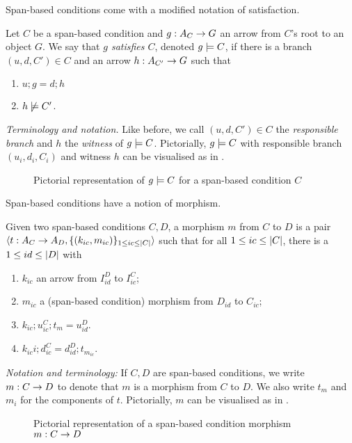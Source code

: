 \medskip\noindent Span-based conditions come with a modified notation of satisfaction.

\begin{definition}
  Let $C$ be a span-based condition and $g:A_C\rightarrow G$ an arrow from $C$'s root to an object $G$. We say that \emph{$g$ satisfies $C$}, denoted $g\models C$, if there is a branch $(u,d,C')\in C$ and an arrow $h:A_{C'}\rightarrow G$ such that
  \begin{enumerate}
  \item $u;g=d;h$
  \item $h\not\models C'$.
  \end{enumerate}
\end{definition}
%

\emph{Terminology and notation.} Like before, we call $(u,d,C')\in C$ the \emph{responsible branch} and $h$ the \emph{witness} of $g\models C$. Pictorially, $g\models C$ with responsible branch $(u_i,d_i,C_i)$ and witness $h$ can be visualised as in .
%
\begin{figure}
  \centering
  
  \caption{Pictorial representation of $g\models C$ for a span-based condition $C$}
\end{figure}

\medskip\noindent
Span-based conditions have a notion of morphism.

\begin{definition}
  Given two span-based conditions $C,D$, a morphism $m$ from $C$ to $D$ is a pair $\langle{t:A_C\rightarrow A_D,\{{(k_{ic},m_{ic})}\}_{1\leq ic\leq |{C}|}}\rangle$ such that for all $1\leq ic\leq |{C}|$, there is a $1\leq id\leq |{D}|$ with
  \begin{enumerate}
  \item $k_{ic}$ an arrow from $I_{id}^D$ to $I_{ic}^C$;
  \item $m_{ic}$ a (span-based condition) morphism from $D_{id}$ to $C_{ic}$;
  \item $k_{ic};u_{ic}^C;t_m=u_{id}^D$.
  \item $k_{ic}i;d_{ic}^C=d_{id}^D;t_{m_{ic}}$.
  \end{enumerate}
\end{definition}
%
\emph{Notation and terminology:} If $C,D$ are span-based conditions, we write $m:C\rightarrow D$ to denote that $m$ is a morphism from $C$ to $D$. We also write $t_m$ and $m_i$ for the components of $t$. Pictorially, $m$ can be visualised as in .
%
\begin{figure}
  \centering
  
  \caption{Pictorial representation of a span-based condition morphism $m:C\rightarrow D$}
\end{figure}

